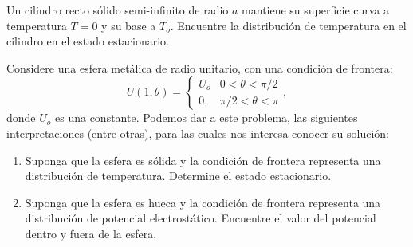 \documentclass[11pt,spanish]{article}
\newcounter{problema}
\begin{document}
  
\prob{} Un cilindro recto s\'olido semi-infinito de radio $a$ mantiene su superficie curva a temperatura $T=0$ y su base a $T_o$. Encuentre la distribuci\'on de temperatura en el cilindro en el estado estacionario.  

\prob{} Considere una esfera metálica de radio unitario, con una condición de frontera:
$$U(1, \theta)=\begin{cases}  
      U_o               & 0<\theta<\pi/2 \\
      0,  & \pi/2<\theta<\pi 
      \end{cases},$$ donde $U_o$ es una constante. 
Podemos dar a este problema, las siguientes interpretaciones (entre otras), para las cuales nos interesa conocer su  solución:
\begin{enumerate}
\item Suponga que la esfera es sólida y la condición de frontera representa una distribución de temperatura. Determine el estado estacionario.
\item Suponga que la esfera es hueca y la condición de frontera representa una distribución de potencial electrostático. Encuentre el valor del potencial dentro y fuera de la esfera.
\end{enumerate}
\end{document}
